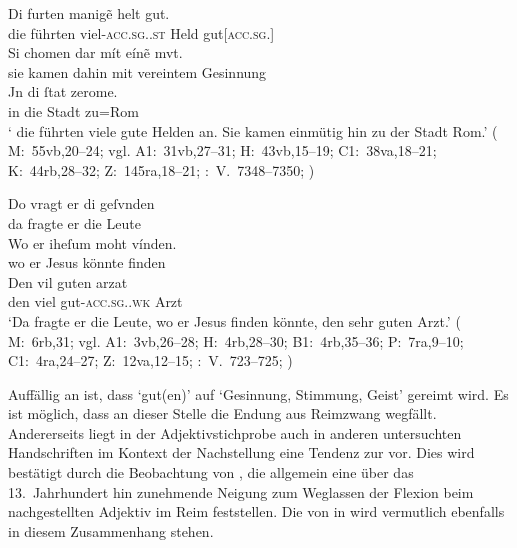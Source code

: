 \begin{exe}
\ex \label{ex:maccadj}
	\begin{xlist}
	\ex \label{ex:maccadj_1}
		\gll Di furten manigẽ helt gut. \\
			die führten viel-\textsc{acc.sg.\MascM.st} Held
			gut[\textsc{acc.sg.\MascM}] \\
	\sn \gll Si chomen dar mít eínẽ mvt. \\
			sie kamen dahin mit vereintem Gesinnung \\
	\sn \gll Jn di ſtat zerome. \\
			in die Stadt zu=Rom \\
		\trans `\textelp{} die führten viele gute Helden an. Sie kamen einmütig
			hin zu der Stadt Rom.'
			(%
				M:~55vb,20--24; vgl.
				A1:~31vb,27--31;
				H:~43vb,15--19;
				C1:~38va,18--21;
				K:~44rb,28--32;
				Z:~145ra,18--21;
				\KC:~V.~7348--7350;
				\cite[216]{schroeder1895}%
			)

	\ex \label{ex:maccadj_2}
		\gll Do vragt er di geſvnden \\
			da fragte er die Leute \\
	\sn \gll Wo er iheſum moht vínden. \\
			wo er Jesus könnte finden \\
	\sn \gll Den vil guten arzat \\
			den viel gut-\textsc{acc.sg.\MascM.wk} Arzt \\
		\trans `Da fragte er die Leute, wo er Jesus finden
			könnte, den sehr guten Arzt.'
			(%
				M:~6rb,31; vgl.
				A1:~3vb,26--28;
				H:~4rb,28--30;
				B1:~4rb,35--36;
				P:~7ra,9--10;
				C1:~4ra,24--27;
				Z:~12va,12--15;
				\KC:~V.~723--725;
				\cite[94]{schroeder1895}%
			)
		\\
	\end{xlist}
\end{exe}

Auffällig an  ist, dass  `gut(en)' auf
 `Gesinnung, Stimmung, Geist' gereimt wird. Es ist möglich, dass an
dieser Stelle die Endung aus Reimzwang wegfällt. Andererseits liegt in der
Adjektivstichprobe auch in anderen untersuchten Handschriften im
Kontext der Nachstellung eine Tendenz zur 
vor. Dies wird bestätigt durch die Beobachtung von \citet[241]{ksw2}, die
allgemein eine über das 13.~Jahrhundert hin zunehmende Neigung zum Weglassen
der Flexion beim nachgestellten Adjektiv im
Reim feststellen. Die  von  in
 wird vermutlich ebenfalls in diesem Zusammenhang stehen.

